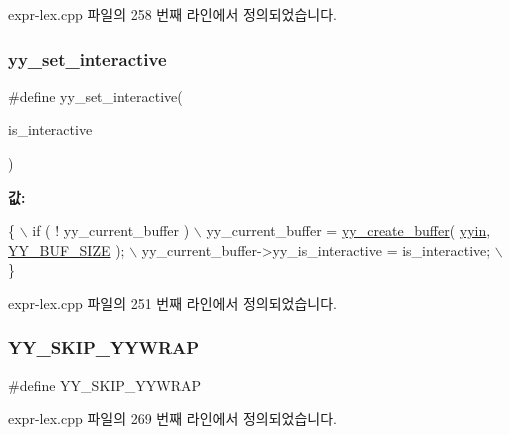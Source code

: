 expr-\/lex.\+cpp 파일의 258 번째 라인에서 정의되었습니다.

\mbox{\label{expr-lex_8cpp_ac56eb96366c08862bf0efe5d83d1fc4c}} 
\subsubsection{\texorpdfstring{yy\+\_\+set\+\_\+interactive}{yy\_set\_interactive}}
{\footnotesize\ttfamily \#define yy\+\_\+set\+\_\+interactive(\begin{DoxyParamCaption}\item[{}]{is\+\_\+interactive }\end{DoxyParamCaption})}

{\bfseries 값\+:}
\begin{DoxyCode}
\{ \(\backslash\)
        if ( ! yy\_current\_buffer ) \(\backslash\)
                yy\_current\_buffer = \mbox{\hyperlink{expr-lex_8cpp_a55588ac24161be2160e907e019dcae5c}{yy\_create\_buffer}}( \mbox{\hyperlink{expr-lex_8cpp_a87a127afa8f6c307fbfba10390675406}{yyin}}, 
      \mbox{\hyperlink{expr-lex_8cpp_ae7e51116e747d3390e7a6cfc6532834c}{YY\_BUF\_SIZE}} ); \(\backslash\)
        yy\_current\_buffer->yy\_is\_interactive = is\_interactive; \(\backslash\)
        \}
\end{DoxyCode}


expr-\/lex.\+cpp 파일의 251 번째 라인에서 정의되었습니다.

\mbox{\label{expr-lex_8cpp_ae1ef5933028cbc587d31328e53d11a99}} 
\subsubsection{\texorpdfstring{Y\+Y\+\_\+\+S\+K\+I\+P\+\_\+\+Y\+Y\+W\+R\+AP}{YY\_SKIP\_YYWRAP}}
{\footnotesize\ttfamily \#define Y\+Y\+\_\+\+S\+K\+I\+P\+\_\+\+Y\+Y\+W\+R\+AP}



expr-\/lex.\+cpp 파일의 269 번째 라인에서 정의되었습니다.

